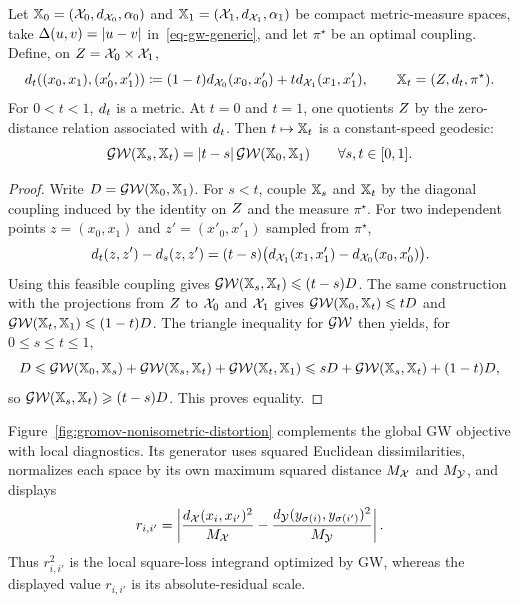 \begin{prop}\label{prop-gw-geodesics}
	Let $\mathbb{X}_0=(\mathcal{X}_0,d_{\mathcal{X}_0},\alpha_0)$ and $\mathbb{X}_1=(\mathcal{X}_1,d_{\mathcal{X}_1},\alpha_1)$ be compact metric-measure spaces, take $\Delta(u,v)=|u-v|$ in~\eqref{eq-gw-generic}, and let $\pi^\star$ be an optimal coupling. Define, on $Z=\mathcal{X}_0\times\mathcal{X}_1$,
	\[
		d_t((x_0,x_1),(x'_0,x'_1))
		\coloneqq
		(1-t)d_{\mathcal{X}_0}(x_0,x'_0)+td_{\mathcal{X}_1}(x_1,x'_1),
		\qquad
		\mathbb{X}_t=(Z,d_t,\pi^\star).
	\]
	For $0<t<1$, $d_t$ is a metric. At $t=0$ and $t=1$, one quotients $Z$ by the zero-distance relation associated with $d_t$. Then $t\mapsto\mathbb{X}_t$ is a constant-speed geodesic:
	\[
		\operatorname{\mathcal{GW}}(\mathbb{X}_s,\mathbb{X}_t)=|t-s|\operatorname{\mathcal{GW}}(\mathbb{X}_0,\mathbb{X}_1)
		\qquad
		\forall s,t\in[0,1].
	\]
\end{prop}

\begin{proof}
	Write $D=\operatorname{\mathcal{GW}}(\mathbb{X}_0,\mathbb{X}_1)$. For $s<t$, couple $\mathbb{X}_s$ and $\mathbb{X}_t$ by the diagonal coupling induced by the identity on $Z$ and the measure $\pi^\star$. For two independent points $z=(x_0,x_1)$ and $z'=(x'_0,x'_1)$ sampled from $\pi^\star$,
	\[
		d_t(z,z')-d_s(z,z')
		=
		(t-s)\big(d_{\mathcal{X}_1}(x_1,x'_1)-d_{\mathcal{X}_0}(x_0,x'_0)\big).
	\]
	Using this feasible coupling gives $\operatorname{\mathcal{GW}}(\mathbb{X}_s,\mathbb{X}_t)\leqslant(t-s)D$. The same construction with the projections from $Z$ to $\mathcal{X}_0$ and $\mathcal{X}_1$ gives $\operatorname{\mathcal{GW}}(\mathbb{X}_0,\mathbb{X}_t)\leqslant tD$ and $\operatorname{\mathcal{GW}}(\mathbb{X}_t,\mathbb{X}_1)\leqslant(1-t)D$. The triangle inequality for $\operatorname{\mathcal{GW}}$ then yields, for $0\leq s\leq t\leq1$,
	\[
		D
		\leqslant
		\operatorname{\mathcal{GW}}(\mathbb{X}_0,\mathbb{X}_s)+\operatorname{\mathcal{GW}}(\mathbb{X}_s,\mathbb{X}_t)+\operatorname{\mathcal{GW}}(\mathbb{X}_t,\mathbb{X}_1)
		\leqslant
		sD+\operatorname{\mathcal{GW}}(\mathbb{X}_s,\mathbb{X}_t)+(1-t)D,
	\]
	so $\operatorname{\mathcal{GW}}(\mathbb{X}_s,\mathbb{X}_t)\geqslant(t-s)D$. This proves equality.
\end{proof}

Figure~\ref{fig:gromov-nonisometric-distortion} complements the global GW objective with local diagnostics. Its generator uses squared Euclidean dissimilarities, normalizes each space by its own maximum squared distance $M_{\mathcal{X}}$ and $M_{\mathcal{Y}}$, and displays
\[
	r_{i,i'}
	=
	\left|
	\frac{d_{\mathcal{X}}(x_i,x_{i'})^2}{M_{\mathcal{X}}}
	-
	\frac{d_{\mathcal{Y}}(y_{\sigma(i)},y_{\sigma(i')})^2}{M_{\mathcal{Y}}}
	\right|.
\]
Thus $r_{i,i'}^2$ is the local square-loss integrand optimized by GW, whereas the displayed value $r_{i,i'}$ is its absolute-residual scale.

